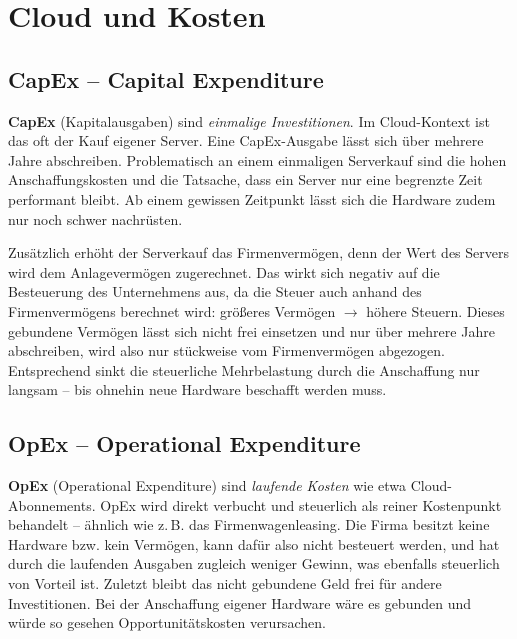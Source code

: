 \section{Cloud und Kosten}
\subsection{CapEx – Capital Expenditure}
\textbf{CapEx} (Kapitalausgaben) sind \emph{einmalige Investitionen}. Im Cloud-Kontext ist das oft der Kauf eigener Server. Eine CapEx-Ausgabe lässt sich über mehrere Jahre abschreiben. Problematisch an einem einmaligen Serverkauf sind die hohen Anschaffungskosten und die Tatsache, dass ein Server nur eine begrenzte Zeit performant bleibt. Ab einem gewissen Zeitpunkt lässt sich die Hardware zudem nur noch schwer nachrüsten.

Zusätzlich erhöht der Serverkauf das Firmenvermögen, denn der Wert des Servers wird dem Anlagevermögen zugerechnet. Das wirkt sich negativ auf die Besteuerung des Unternehmens aus, da die Steuer auch anhand des Firmenvermögens berechnet wird: größeres Vermögen $\rightarrow$ höhere Steuern.
Dieses gebundene Vermögen lässt sich nicht frei einsetzen und nur über mehrere Jahre abschreiben, wird also nur stückweise vom Firmenvermögen abgezogen.
Entsprechend sinkt die steuerliche Mehrbelastung durch die Anschaffung nur langsam -- bis ohnehin neue Hardware beschafft werden muss.
\subsection{OpEx – Operational Expenditure}
\textbf{OpEx} (Operational Expenditure) sind \emph{laufende Kosten} wie etwa Cloud-Abonnements. OpEx wird direkt verbucht und steuerlich als reiner Kostenpunkt behandelt -- ähnlich wie z.\,B. das Firmenwagenleasing. Die Firma besitzt keine Hardware bzw. kein Vermögen, kann dafür also nicht besteuert werden, und hat durch die laufenden Ausgaben zugleich weniger Gewinn, was ebenfalls steuerlich von Vorteil ist. Zuletzt bleibt das nicht gebundene Geld frei für andere Investitionen. Bei der Anschaffung eigener Hardware wäre es gebunden und würde so gesehen Opportunitätskosten verursachen.
